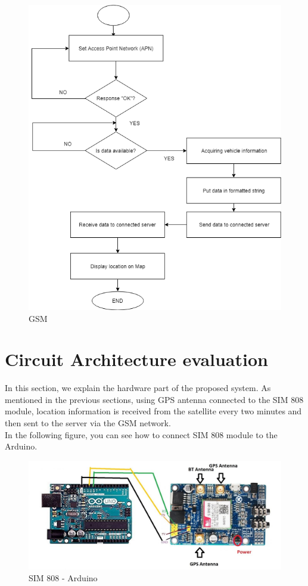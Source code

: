 \begin{figure}[!h]
	\centerline{\includegraphics[width=.9\textwidth]{continue-gsm}}
	\caption{GSM \cite{8}}
\end{figure}
\newpage
\section{Circuit Architecture evaluation}

In this section, we explain the hardware part of the proposed system. As mentioned in the previous sections, using GPS antenna connected to the SIM 808 module, location information is received from the satellite every two minutes and then sent to the server via the GSM network.\\
In the following figure, you can see how to connect SIM 808 module to the Arduino.
\begin{figure}[!h]
	\centerline{\includegraphics[width=.8\textwidth]{sim808-arduino}}
	\caption{SIM 808 - Arduino}
\end{figure}\\

